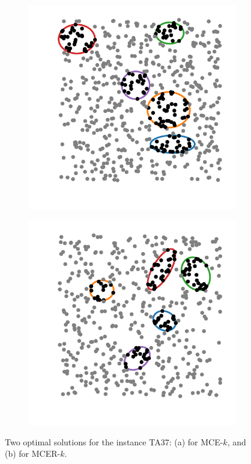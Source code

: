 \begin{figure}
	\begin{subfigure}{.5\textwidth}
		\centering
		\includegraphics[scale=.9]{tex/figures/MCE_TA37}
		\caption{}
		\label{fig:MCE_TA37}
	\end{subfigure}
	\begin{subfigure}{.5\textwidth}
		\centering
		\includegraphics[scale=.9]{tex/figures/MCER_TA37}
		\caption{}
		\label{fig:MCER_TA37}
	\end{subfigure}
	\caption{Two optimal solutions for the instance TA37: (a) for MCE-$k$, and (b) for MCER-$k$.}
	\label{fig:TA37}
\end{figure}

